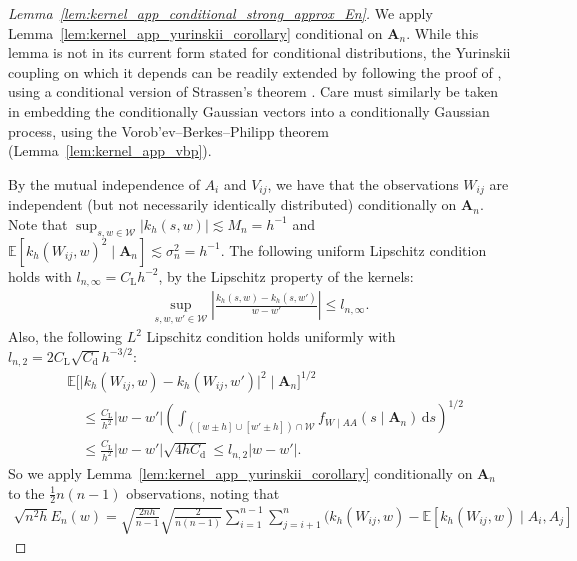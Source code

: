 \documentclass[11pt,lof]{puthesis}
\newcommand{\E}{\ensuremath{\mathbb{E}}}
\newcommand{\rL}{\ensuremath{\mathrm{L}}}
\newcommand{\rd}{\ensuremath{\mathrm{d}}}
\newcommand{\bA}{\ensuremath{\mathbf{A}}}
\newcommand{\cW}{\ensuremath{\mathcal{W}}}
\newcommand{\diff}[1]{\,\mathrm{d}#1}
\theoremstyle{break}
\theoremstyle{proof}
\newtheorem{proof}{Proof}
\begin{document}
\begin{proof}[Lemma~\ref{lem:kernel_app_conditional_strong_approx_En}]

  We apply Lemma~\ref{lem:kernel_app_yurinskii_corollary} conditional on
  $\bA_n$. While this lemma is not in its current form
  stated for conditional distributions,
  the Yurinskii coupling on which it depends can be readily extended
  by following the proof of \citet[Lemma~38]{belloni2019conditional},
  using a conditional version of Strassen's theorem
  \cite[Theorem~B.2]{chen2020jackknife}.
  Care must similarly be taken in embedding the conditionally Gaussian vectors
  into a conditionally Gaussian process, using the
  Vorob'ev--Berkes--Philipp theorem (Lemma~\ref{lem:kernel_app_vbp}).

  By the mutual independence of $A_i$ and $V_{i j}$,
  we have that the observations
  $W_{i j}$ are independent
  (but not necessarily identically distributed)
  conditionally on $\bA_n$.
  Note that
  $\sup_{s,w \in \cW} |k_h(s,w)| \lesssim M_n = h^{-1}$
  and $\E[k_h(W_{i j},w)^2 \mid \bA_n] \lesssim \sigma_n^2 = h^{-1}$.
  The following uniform Lipschitz condition holds
  with $l_{n,\infty} = C_\rL h^{-2}$,
  by the Lipschitz property of the kernels:
  \begin{align*}
    \sup_{s,w,w' \in \cW}
    \left|
    \frac{k_h(s, w) - k_h(s, w')}
    {w-w'}
    \right|
    \leq
    l_{n,\infty}.
  \end{align*}
  Also, the following $L^2$ Lipschitz condition holds
  uniformly with $l_{n,2} = 2 C_\rL \sqrt{C_\rd} h^{-3/2}$:
  \begin{align*}
    &\E\big[
      \big|
      k_h(W_{i j}, w) - k_h(W_{i j}, w')
      \big|^2
      \mid \bA_n
    \big]^{1/2} \\
    &\quad\leq
    \frac{C_\rL}{h^2}
    |w-w'|
    \left(
      \int_{([w \pm h] \cup [w' \pm h]) \cap \cW}
      f_{W \mid AA}(s \mid \bA_n)
      \diff{s}
    \right)^{1/2} \\
    &\quad\leq
    \frac{C_\rL}{h^2}
    |w-w'|
    \sqrt{4h C_\rd}
    \leq
    l_{n,2}
    |w-w'|.
  \end{align*}
  So we apply
  Lemma~\ref{lem:kernel_app_yurinskii_corollary}
  conditionally on $\bA_n$
  to the $\frac{1}{2}n(n-1)$ observations,
  noting that
  \begin{align*}
    \sqrt{n^2h} E_n(w)
    =
    \sqrt{\frac{2 n h}{n-1}}
    \sqrt{\frac{2}{n(n-1)}}
    \sum_{i=1}^{n-1}
    \sum_{j=i+1}^{n}
    \Big(
      k_h(W_{i j},w)
      - \E[k_h(W_{i j},w) \mid A_i, A_j]

\end{align*}
\end{proof}
\end{document}
